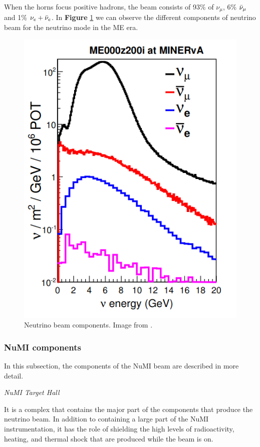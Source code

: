 When the horns focus positive hadrons, the beam consists of 93\% of $\nu_\mu$, 6\% $\Bar{\nu}_\mu$ and 1\% $\nu_e + \Bar{\nu}_e$. In \textbf{Figure} \ref{fig:MnvExp:NuMI:NuMIBeamComponents} we can observe the different components of neutrino beam for the neutrino mode in the ME era. 
\begin{figure}[!htb]
\centering
\includegraphics[scale=0.4]{Figures/Chapter2/NuMIbeamComponents.png}
        \caption{Neutrino beam components. Image from \cite{LeoThesis}.} 
\label{fig:MnvExp:NuMI:NuMIBeamComponents}
\end{figure}


\subsubsection{NuMI components}
In this subsection, the components of the NuMI beam are described in more detail.

\textit{NuMI Target Hall}

It is a complex that contains the major part of the components that produce the neutrino beam. In addition to containing a large part of the NuMI instrumentation, it has the role of shielding the high levels of radioactivity, heating, and thermal shock that are produced while the beam is on.  

